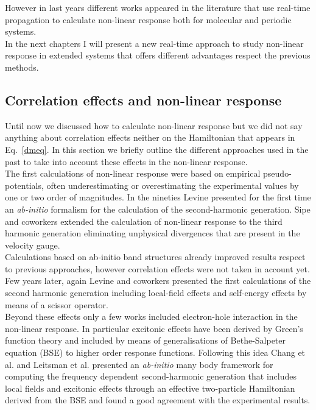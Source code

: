However in last years different works appeared in the literature that use real-time propagation to calculate non-linear response both for molecular\cite{takimoto:154114,ding2013efficient} and periodic systems.\cite{goncharov2013nonlinear}\\
In the next chapters I will present a new real-time approach to study  non-linear response in extended systems that offers different advantages respect the previous methods.\cite{nloptics2013}

\subsection{Correlation effects and non-linear response}
Until now we discussed how to calculate non-linear response but we did not say anything about correlation effects neither on the Hamiltonian that appears in Eq.~\ref{dmeq}. In this section we  briefly outline the different approaches used in the past to take into account these effects in the non-linear response.\\
The first calculations of non-linear response were based on empirical pseudo-potentials, often underestimating or overestimating the experimental values by one or two order of magnitudes.\cite{PhysRevB.12.2325,PhysRevB.36.9708}
In the nineties Levine\cite{PhysRevB.42.3567} presented for the first time an \emph{ab-initio} formalism for the calculation of the second-harmonic generation. Sipe and coworkers extended the calculation of non-linear response to the third harmonic generation eliminating  unphysical divergences that are present in the velocity gauge.\cite{PhysRevB.61.5337,PhysRevB.48.11705}\\ 
Calculations based on ab-initio band structures already improved results respect to previous approaches, however correlation effects were not taken in account yet. Few years later, again Levine and coworkers presented the first calculations of the second harmonic generation including local-field effects and self-energy effects by means of a scissor operator.\cite{PhysRevLett.63.1719,PhysRevB.56.1787} \\
Beyond these effects only a few works included electron-hole interaction in the non-linear response. In particular excitonic effects have been derived by Green's function theory and included by means of generalisations of Bethe-Salpeter equation (BSE)\cite{strinati} to higher order response functions. Following this idea Chang et al.\cite{Chang2002}  and Leitsman et al.\cite{Leitsmann2005} presented an \emph{ab-initio} many body framework for computing the frequency dependent second-harmonic generation that includes local fields and excitonic effects through an effective two-particle Hamiltonian derived from the BSE and found a good agreement with the experimental results.\\
